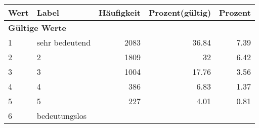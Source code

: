      \begin{longtable}{lXrrr}
     \toprule
     \textbf{Wert} & \textbf{Label} & \textbf{Häufigkeit} & \textbf{Prozent(gültig)} & \textbf{Prozent} \\
     \endhead
     \midrule
     \multicolumn{5}{l}{\textbf{Gültige Werte}}\\

     1 &
     \multicolumn{1}{X}{ sehr bedeutend   } &


       \num{2083} &
       \num[round-mode=places,round-precision=2]{36.84} &
         \num[round-mode=places,round-precision=2]{7.39} \\

     2 &
     \multicolumn{1}{X}{ 2   } &


       \num{1809} &
       \num[round-mode=places,round-precision=2]{32} &
         \num[round-mode=places,round-precision=2]{6.42} \\

     3 &
     \multicolumn{1}{X}{ 3   } &


       \num{1004} &
       \num[round-mode=places,round-precision=2]{17.76} &
         \num[round-mode=places,round-precision=2]{3.56} \\

     4 &
     \multicolumn{1}{X}{ 4   } &


       \num{386} &
       \num[round-mode=places,round-precision=2]{6.83} &
         \num[round-mode=places,round-precision=2]{1.37} \\

     5 &
     \multicolumn{1}{X}{ 5   } &


       \num{227} &
       \num[round-mode=places,round-precision=2]{4.01} &
         \num[round-mode=places,round-precision=2]{0.81} \\

     6 &
     \multicolumn{1}{X}{ bedeutungslos   } &



\end{longtable}
